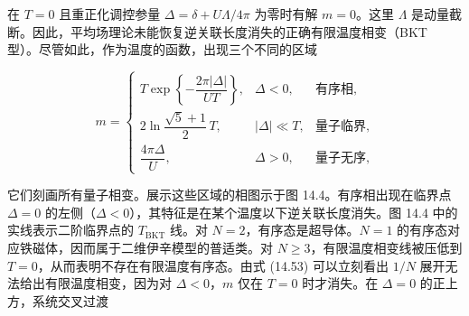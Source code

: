 在 $T=0$ 且重正化调控参量 $\Delta=\delta+U\Lambda/4\pi$ 为零时有解 $m=0$。这里 $\Lambda$ 是动量截断。因此，平均场理论未能恢复逆关联长度消失的正确有限温度相变（BKT 型）。尽管如此，作为温度的函数，出现三个不同的区域

\begin{equation*}
m = \left\{ \begin{array}{lll}
T \exp\left\{ -\dfrac{2\pi|\Delta|}{UT} \right\}, & \Delta<0, & \text{有序相}, \\[2ex]
2\ln\dfrac{\sqrt{5}+1}{2}\, T, & |\Delta|\ll T, & \text{量子临界}, \\[2ex]
\dfrac{4\pi\Delta}{U}, & \Delta>0, & \text{量子无序},
\end{array} \right.\tag{14.53}
\end{equation*}

它们刻画所有量子相变。展示这些区域的相图示于图 14.4。有序相出现在临界点 $\Delta=0$ 的左侧（$\Delta<0$），其特征是在某个温度以下逆关联长度消失。图 14.4 中的实线表示二阶临界点的 $T_{\mathrm{BKT}}$ 线。对 $N=2$，有序态是超导体。$N=1$ 的有序态对应铁磁体，因而属于二维伊辛模型的普适类。对 $N\ge 3$，有限温度相变线被压低到 $T=0$，从而表明不存在有限温度有序态。由式 (14.53) 可以立刻看出 $1/N$ 展开无法给出有限温度相变，因为对 $\Delta<0$，$m$ 仅在 $T=0$ 时才消失。在 $\Delta=0$ 的正上方，系统交叉过渡
